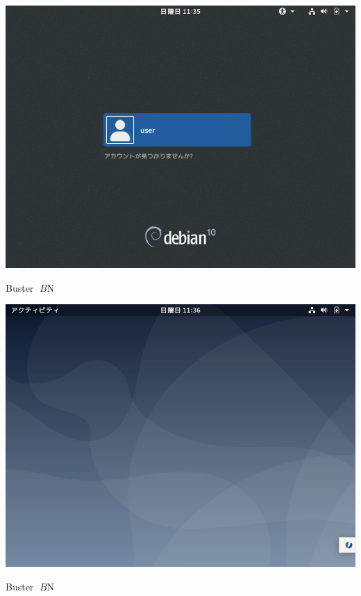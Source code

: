 \documentclass[mingoth,a4paper]{jsarticle}
\begin{document}
{{{{{{{{{{{{{{{{\begin{center}
\includegraphics[keepaspectratio,width=1\hsize]{image201907/buster_gdm3.png}
\end{center}



Buster $B$N%

\begin{center}
\includegraphics[keepaspectratio,width=1\hsize]{image201907/buster_gnome_1.png}
\end{center}



Buster $B$N%

}}}}}}}}}}}}}}}}
\end{document}
